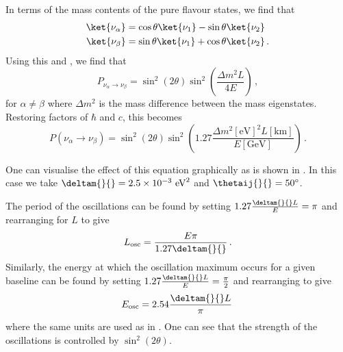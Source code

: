 In terms of the mass contents of the pure flavour states, we find that
\begin{align}
  \ket{\nu_{\alpha}} &= \cos\theta\ket{\nu_{1}} - \sin\theta\ket{\nu_{2}} \\
  \ket{\nu_{\beta}}  &= \sin\theta\ket{\nu_{1}} + \cos\theta\ket{\nu_{2}} \, .
\end{align}
Using this and , we find that
\begin{equation}
  P_{\nu_{\alpha}\rightarrow\nu_{\beta}} = \sin^{2}(2\theta)\sin^{2} \left(\frac{\Delta m^{2} L}{4E} \right) \, ,
\end{equation}
for $\alpha \neq \beta$ where $\Delta m^{2}$ is the mass difference between the mass eigenstates.
Restoring factors of $\hbar$ and $c$, this becomes
\begin{equation}
  P(\nu_{\alpha}\rightarrow\nu_{\beta}) = \sin^{2}(2\theta) \sin^{2} \left( 1.27 \frac{\Delta m^{2} [\text{eV}]^{2} L [\text{km}]}{E[\text{GeV}]} \right) \, .
  \label{eq:twoNuProb}
\end{equation}

One can visualise the effect of this equation graphically as is shown in . 
In this case we take $\deltam{}{} = 2.5 \times 10^{-3}~\text{eV}^{2}$ and $\thetaij{}{} = 50^{\circ}$.

The period of the oscillations can be found by setting $1.27 \frac{\deltam{}{}L}{E} = \pi$ and rearranging for $L$ to give
\begin{equation}
  L_{\text{osc}} = \frac{E \pi}{1.27 \deltam{}{}} \, .
\end{equation}
Similarly, the energy at which the oscillation maximum occurs for a given baseline can be found by setting $1.27 \frac{\deltam{}{}L}{E} = \frac{\pi}{2}$ and rearranging to give
\begin{equation}
  E_{\text{osc}} = 2.54 \frac{\deltam{}{} L}{\pi} \,
\end{equation}
where the same units are used as in .
One can see that the strength of the oscillations is controlled by $\sin^{2}(2\theta)$.

